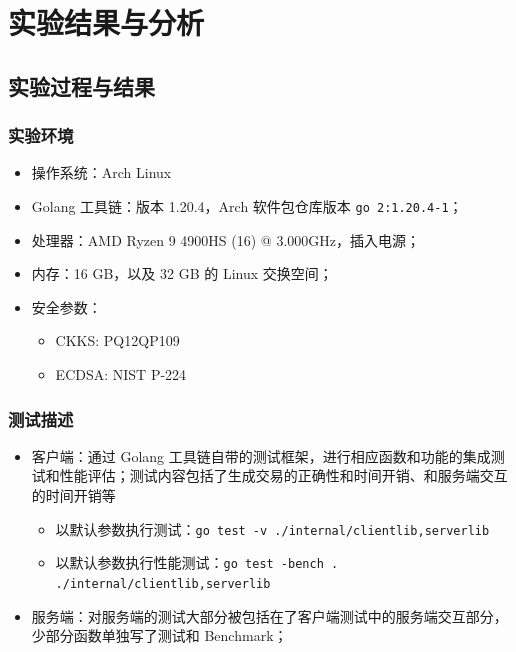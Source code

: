 \section{实验结果与分析}

\subsection{实验过程与结果}

\begin{frame}
    \frametitle{实验环境}

    \begin{itemize}
        \item 操作系统：Arch Linux
        \item Golang 工具链：版本 1.20.4，Arch 软件包仓库版本 \texttt{go 2:1.20.4-1}；
        \item 处理器：AMD Ryzen 9 4900HS (16) @ 3.000GHz，插入电源；
        \item 内存：16 GB，以及 32 GB 的 Linux 交换空间； 
        \item 安全参数：
        \begin{itemize}
            \item CKKS: PQ12QP109
            \item ECDSA: NIST P-224
        \end{itemize}
    \end{itemize}

\end{frame}

\begin{frame}
    \frametitle{测试描述}

    \begin{itemize}
        \item 客户端：通过 Golang 工具链自带的测试框架，进行相应函数和功能的集成测试和性能评估；\newline 测试内容包括了生成交易的正确性和时间开销、和服务端交互的时间开销等
        \begin{itemize}
            \item 以默认参数执行测试：\texttt{go test -v ./internal/{clientlib,serverlib}}
            \item 以默认参数执行性能测试：\texttt{go test -bench . ./internal/{clientlib,serverlib}}
        \end{itemize}
        \item 服务端：对服务端的测试大部分被包括在了客户端测试中的服务端交互部分，少部分函数单独写了测试和 Benchmark；
    \end{itemize}

\end{frame}

